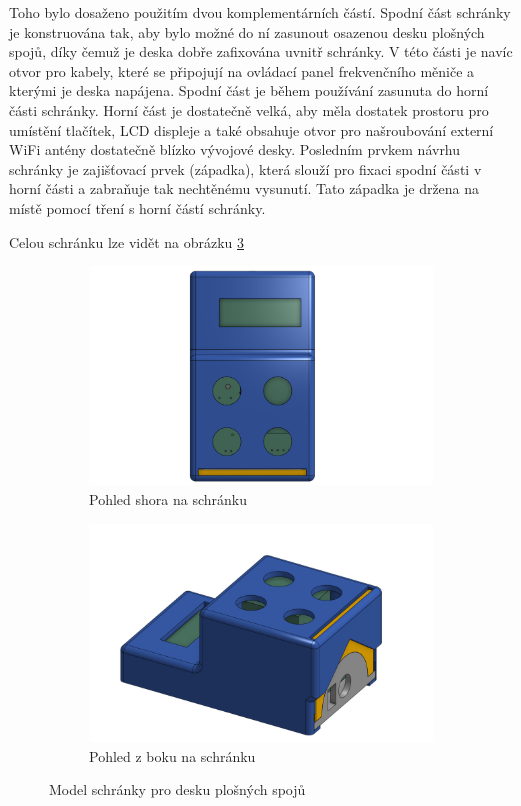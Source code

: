Toho bylo dosaženo použitím dvou komplementárních částí. Spodní část schránky je konstruována tak, aby bylo možné do ní zasunout osazenou desku plošných spojů, díky čemuž je deska dobře zafixována uvnitř schránky. V této části je navíc otvor pro kabely, které se připojují na ovládací panel frekvenčního měniče a kterými je deska napájena. Spodní část je během používání zasunuta do horní části schránky. Horní část je dostatečně velká, aby měla dostatek prostoru pro umístění tlačítek, LCD displeje a také obsahuje otvor pro našroubování externí WiFi antény dostatečně blízko vývojové desky. Posledním prvkem návrhu schránky je zajišťovací prvek (západka), která slouží pro fixaci spodní části v horní části a zabraňuje tak nechtěnému vysunutí. Tato západka je držena na místě pomocí tření s horní částí schránky.

Celou schránku lze vidět na obrázku \ref{fig:krabickaObaPohledy}

\begin{figure}[hptb]
	\centering
	\begin{subfigure}[t]{0.48\textwidth}
		\includegraphics[width=\textwidth]{images/krabickaTop.png}
		\caption{Pohled shora na schránku}
		\label{fig:krabickaTop}
	\end{subfigure}%
	\hfill
	\begin{subfigure}[t]{0.48\textwidth}
		\includegraphics[width=\textwidth]{images/KrabickaZBoku.png}
		\caption{Pohled z boku na schránku}
		\label{fig:KrabickaZBoku}
	\end{subfigure}
	\caption{Model schránky pro desku plošných spojů}
	\label{fig:krabickaObaPohledy}
\end{figure}

